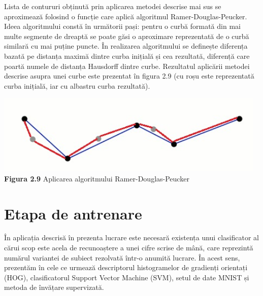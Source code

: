 \documentclass[a4paper,12pt]{report}
\newcommand\tab[1][1cm]{\hspace*{#1}}
\begin{document}
\tab Lista de contururi obținută prin aplicarea metodei descrise mai sus se aproximează folosind o funcție care aplică algoritmul Ramer-Douglas-Peucker\cite{wikip1}. Ideea algoritmului constă în următorii pași: pentru o curbă formată din mai multe segmente de dreaptă se poate găsi o aproximare reprezentată de o curbă similară cu mai puține puncte.  În realizarea algoritmului se definește diferența bazată pe distanța maximă dintre curba inițială și cea rezultată, diferență care poartă numele de distanța Hausdorff dintre curbe. Rezultatul aplicării metodei descrise asupra unei curbe este prezentat în figura 2.9 (cu roșu este reprezentată curba inițială, iar cu albastru curba rezultată).
\begin {center} 
	\begin {footnotesize} 
		\includegraphics[width = 130mm]{fig2_9} \\
		\textbf  {Figura 2.9} Aplicarea algoritmului Ramer-Douglas-Peucker
	\end {footnotesize} 
\end {center}
\section{Etapa de antrenare}
\tab În aplicația descrisă în prezenta lucrare este necesară existența unui clasificator al cărui scop este acela de recunoaștere a unei cifre scrise de mână, care reprezintă numărul variantei de subiect rezolvată într-o anumită lucrare. În acest sens, prezentăm în cele ce urmează descriptorul histogramelor de gradienți orientați (HOG), clasificatorul Support Vector Machine (SVM), setul de date MNIST și metoda de învățare supervizată.
\end{document}
